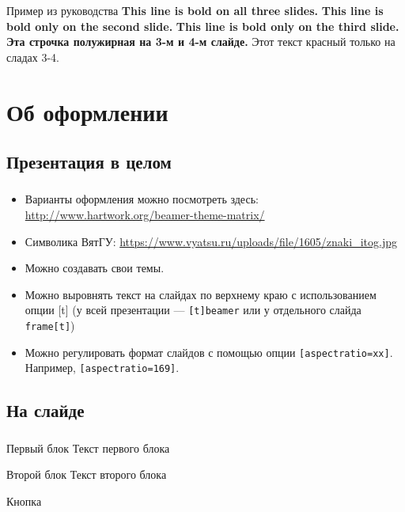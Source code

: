 \documentclass[t, aspectratio=169, handout]{beamer}  %
\begin{document}
	\begin{frame}{Пример из руководства}
		\textbf{This line is bold on all three slides.}
		\textbf<2>{This line is bold only on the second slide.}
		\textbf<3>{This line is bold only on the third slide.}
		\textbf<3,4>{Эта строчка полужирная на 3-м и 4-м слайде.}
		 Этот текст красный только на сладах 3-4.
	\end{frame}
	
	\section{Об оформлении}
	\subsection{Презентация в целом}
	
	\begin{frame}[c] %
		\frametitle{\insertsection}
		\framesubtitle{\insertsubsection}
		\begin{itemize}
			\item Варианты оформления можно посмотреть здесь:  \href{http://www.hartwork.org/beamer-theme-matrix/}{http://www.hartwork.org/beamer-theme-matrix/} 
			\item Символика ВятГУ: \href{https://www.vyatsu.ru/uploads/file/1605/znaki_itog.jpg}{https://www.vyatsu.ru/uploads/file/1605/znaki\_itog.jpg}
			\item Можно создавать свои темы.
			\item Можно выровнять текст на слайдах по верхнему краю с использованием опции [t] (у всей презентации ---  \texttt{[t]{beamer}} или у отдельного слайда \texttt{{frame}[t]}) 
			\item Можно регулировать формат слайдов с помощью опции \texttt{[aspectratio=xx]}. Например, \texttt{[aspectratio=169]}. 
		\end{itemize}
	\end{frame}
	
	\subsection{На слайде}
	
	\begin{frame}
		\frametitle{\insertsection}
		\framesubtitle{\insertsubsection}
		\begin{block}{Первый блок}
			Текст первого блока
		\end{block}
		\begin{block}{Второй блок}
			Текст второго блока
		\end{block}
		\begin{block}{Кнопка}
			\hyperlink{lab}{} 
		\end{block}
	\end{frame}
	
\end{document}
